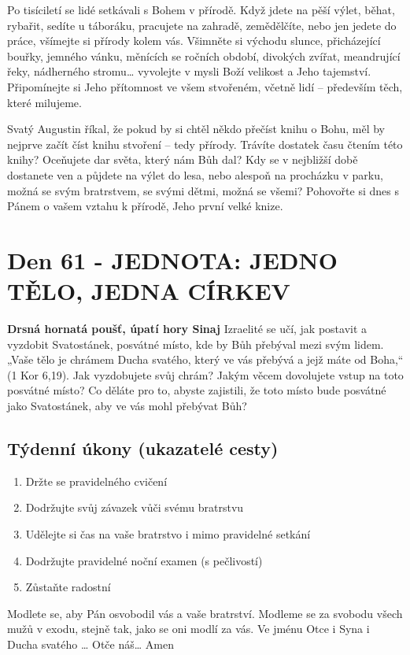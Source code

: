 \documentclass[11pt]{article}
\newcommand{\zacatekDevatyTyden}{
\textbf{Drsná hornatá poušť, úpatí hory Sinaj} \newline 
Izraelité se učí, jak postavit a vyzdobit Svatostánek, posvátné místo, kde by Bůh přebýval mezi svým lidem. „Vaše tělo je chrámem Ducha svatého, který ve vás přebývá a jejž máte od Boha,“ (1 Kor 6,19). Jak vyzdobujete svůj chrám? Jakým věcem dovolujete vstup na toto posvátné místo? Co děláte pro to, abyste zajistili, že toto místo bude posvátné jako Svatostánek, aby ve vás mohl přebývat Bůh?

\subsection*{Týdenní úkony (ukazatelé cesty)}
\begin{enumerate}
  \item Držte se pravidelného cvičení
  \item Dodržujte svůj závazek vůči svému bratrstvu
  \item Udělejte si čas na vaše bratrstvo i mimo pravidelné setkání
  \item Dodržujte pravidelné noční examen (s pečlivostí)
  \item Zůstaňte radostní
\end{enumerate}
Modlete se, aby Pán osvobodil vás a vaše bratrství. \newline
Modleme se za svobodu všech mužů v exodu, stejně tak, jako se oni modlí za vás.\newline
Ve jménu Otce i Syna i Ducha svatého …  Otče náš… Amen
}
\begin{document}
Po tisíciletí se lidé setkávali s Bohem v přírodě. Když jdete na pěší výlet, běhat, rybařit, sedíte u táboráku, pracujete na
zahradě, zemědělčíte, nebo jen jedete do práce, všímejte si přírody kolem vás. Všimněte si východu slunce, přicházející
bouřky, jemného vánku, měnících se ročních období, divokých zvířat, meandrující řeky, nádherného stromu…
vyvolejte v mysli Boží velikost a Jeho tajemství. Připomínejte si Jeho přítomnost ve všem stvořeném, včetně lidí –
především těch, které milujeme.

Svatý Augustin říkal, že pokud by si chtěl někdo přečíst knihu o Bohu, měl by nejprve začít číst knihu stvoření – tedy
přírody. Trávíte dostatek času čtením této knihy? Oceňujete dar světa, který nám Bůh dal? Kdy se v nejbližší době
dostanete ven a půjdete na výlet do lesa, nebo alespoň na procházku v parku, možná se svým bratrstvem, se svými
dětmi, možná se všemi? Pohovořte si dnes s Pánem o vašem vztahu k přírodě, Jeho první velké knize.


\newpage
\section{Den 61 - JEDNOTA: JEDNO TĚLO, JEDNA CÍRKEV}
\zacatekDevatyTyden
\end{document}
